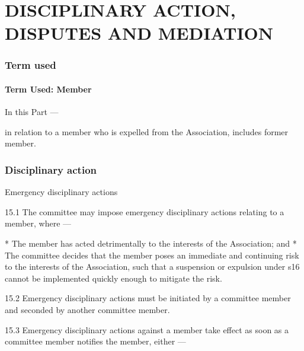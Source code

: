 \documentclass[../constitution.tex]{subfiles}
\begin{document}
\part{DISCIPLINARY ACTION, DISPUTES AND MEDIATION} \label{part-4-disciplinary-action-disputes-and-mediation}


\section{Term used} \label{division-1-term-used}

\hypertarget{term-used-member}{%
\subsection{Term Used: Member}\label{term-used-member}}

In this Part  ---

 in relation to a member who is expelled from the Association, includes former member.

\hypertarget{division-2-disciplinary-action}{%
\section{Disciplinary action}\label{division-2-disciplinary-action}}


Emergency disciplinary actions

15.1 The committee may impose emergency disciplinary actions relating to a member, where ---

* The member has acted detrimentally to the interests of the Association; and
* The committee decides that the member poses an immediate and continuing risk to the interests of the Association, such that a suspension or expulsion under s16 cannot be implemented quickly enough to mitigate the risk.

15.2 Emergency disciplinary actions must be initiated by a committee member and seconded by another committee member.

15.3 Emergency disciplinary actions against a member take effect as soon as a committee member notifies the member, either ---
\end{document}
